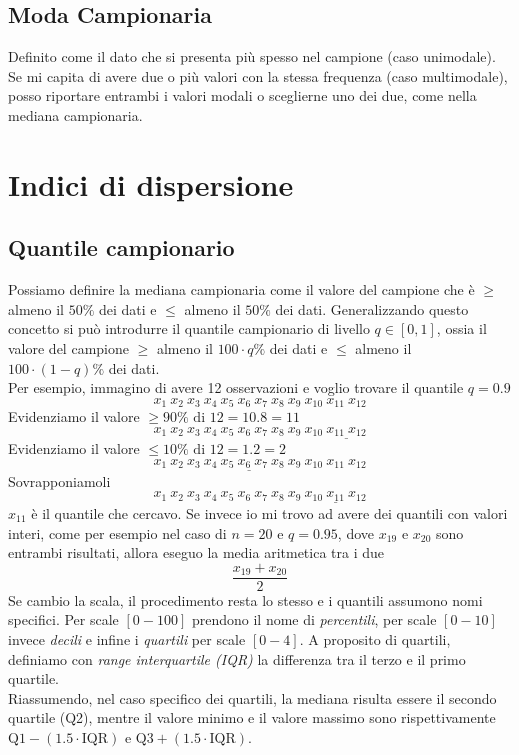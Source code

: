 \documentclass[11pt]{report}
\begin{document}
\subsection{Moda Campionaria}
Definito come il dato che si presenta più spesso nel campione (caso unimodale). Se mi capita di avere due o più valori con la stessa frequenza (caso multimodale), posso riportare entrambi i valori modali o sceglierne uno dei due, come nella mediana campionaria.

\section{Indici di dispersione}
\subsection{Quantile campionario}
Possiamo definire la mediana campionaria come il valore del campione che è $\geq$ almeno il $50\%$ dei dati e $\leq$ almeno il $50\%$ dei dati. Generalizzando questo concetto si può introdurre il quantile campionario di livello $q \in [0,1]$, ossia il valore del campione $\geq$ almeno il $100 \cdot q\%$ dei dati e $\leq$ almeno il $100 \cdot (1-q)\%$ dei dati.\\
Per esempio, immagino di avere 12 osservazioni e voglio trovare il quantile $q=0.9$
\begin{equation}
    x_1\ x_2\ x_3\ x_4\ x_5\ x_6\ x_7\ x_8\ x_9\ x_{10}\ x_{11}\ x_{12}
\end{equation}
Evidenziamo il valore $\geq 90\%\text{ di }12 = 10.8 = 11$
\begin{equation}
    x_1\ x_2\ x_3\ x_4\ x_5\ x_6\ x_7\ x_8\ x_9\ x_{10}\ \underline{x_{11}\ x_{12}}
\end{equation}
Evidenziamo il valore $\leq 10\%\text{ di }12 = 1.2 = 2$
\begin{equation}
    \underline{x_1\ x_2\ x_3\ x_4\ x_5\ x_6\ x_7\ x_8\ x_9\ x_{10}\ x_{11}}\ x_{12}
\end{equation}
Sovrapponiamoli
\begin{equation}
    x_1\ x_2\ x_3\ x_4\ x_5\ x_6\ x_7\ x_8\ x_9\ x_{10}\ \underline{x_{11}}\ x_{12}
\end{equation}
$x_{11}$ è il quantile che cercavo. Se invece io mi trovo ad avere dei quantili con valori interi, come per esempio nel caso di $n=20$ e $q=0.95$, dove $x_{19}$ e $x_{20}$ sono entrambi risultati, allora eseguo la media aritmetica tra i due
\begin{equation}
    \frac{x_{19} + x_{20}}{2}
\end{equation}
Se cambio la scala, il procedimento resta lo stesso e i quantili assumono nomi specifici. Per scale $[0-100]$ prendono il nome di \textit{percentili}, per scale $[0-10]$ invece \textit{decili} e infine i \textit{quartili} per scale $[0-4]$. A proposito di quartili, definiamo con \textit{range interquartile (IQR)} la differenza tra il terzo e il primo quartile.\\
Riassumendo, nel caso specifico dei quartili, la mediana risulta essere il secondo quartile (Q2), mentre il valore minimo e il valore massimo sono rispettivamente $\text{Q1} - (1.5 \cdot \text{IQR})$ e $\text{Q3} + (1.5 \cdot \text{IQR})$.
\end{document}
